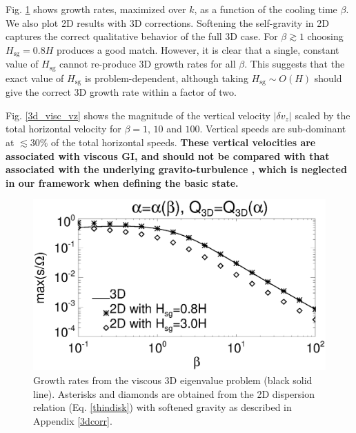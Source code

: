Fig. \ref{3d_visc} shows growth rates, maximized over $k$, as a
function of the cooling time $\beta$. We also plot 2D results with 3D
corrections. Softening the self-gravity in 2D captures the correct 
qualitative behavior of the full 3D case. For $\beta\gtrsim 1$
choosing $H_\mathrm{sg}=0.8H$ produces a good match. However, it is
clear that a single, constant value of $H_\mathrm{sg}$ cannot
re-produce 3D growth rates for all $\beta$. This suggests that the
exact value of $H_\mathrm{sg}$ is problem-dependent, although taking 
$H_\mathrm{sg}\sim O(H)$ should give the correct 3D growth rate within 
a factor of two. 


Fig. \ref{3d_visc_vz} shows the magnitude of the vertical velocity 
$|\delta v_z|$ scaled by the total horizontal velocity for $\beta =
1,\,10$ and $100$. Vertical speeds are sub-dominant at $\lesssim 30\%$
of the total horizontal speeds. 
{\bf These vertical velocities are associated with viscous
  GI, and should not be compared with that associated with the
  underlying gravito-turbulence \citep[e.g.][]{shi14},
  which is neglected in our framework when defining the basic state.   
}

\begin{figure}
  \includegraphics[width=\linewidth,clip=true,trim=0cm 0.cm 0.cm
    0.0cm]{figures/growth_visc3d}
  \caption{Growth rates from the viscous 3D eigenvalue problem (black solid
    line). Asterisks and diamonds are obtained from the 2D dispersion
    relation (Eq. \ref{thindisk}) with softened gravity as described
    in Appendix \ref{3dcorr}. \label{3d_visc}} 
\end{figure}



